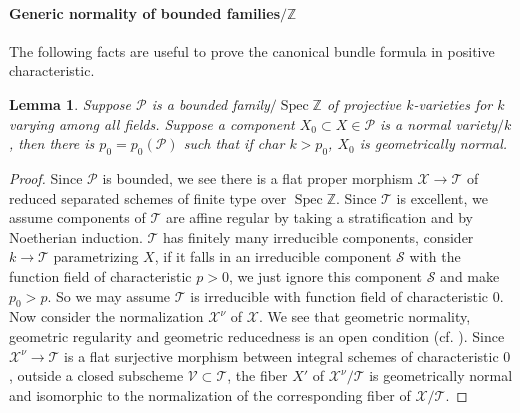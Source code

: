 \documentclass[letterpaper,reqno,12pt]{amsart}
\DeclareMathOperator{\Spec}{Spec}
\newcommand{\tbf}{\textbf}
\numberwithin{equation}{section}
\theoremstyle{plain}
\newtheorem{lemma}[theorem]{Lemma}
\begin{document}
\paragraph{\tbf{Generic normality of bounded families$/\mathbb Z$}}
The following facts are useful to prove the canonical bundle formula in positive characteristic.
\begin{lemma}\label{genorm}
    Suppose $\mathcal P$ is a bounded family$/\Spec\mathbb Z$ of projective $k$-varieties for $k$ varying among all fields. Suppose a component $X_0\subset X\in\mathcal P$ is a normal variety$/k$, then there is $p_0=p_0(\mathcal P)$ such that if char $k>p_0$, $X_0$ is geometrically normal.
\end{lemma}
\begin{proof}
    Since $\mathcal P$ is bounded, we see there is a flat proper morphism $\mathcal X\to\mathcal T$ of reduced separated schemes of finite type over $\Spec\mathbb Z$. Since $\mathcal T$ is excellent, we assume components of $\mathcal T$ are affine regular by taking a stratification and by Noetherian induction. $\mathcal T$ has finitely many irreducible components, consider $k\to \mathcal T$ parametrizing $X$, if it falls in an irreducible component $\mathcal S$ with the function field of characteristic $p>0$, we just ignore this component $\mathcal S$ and make $p_0>p$. So we may assume $\mathcal T$ is irreducible with function field of characteristic $0$. Now consider the normalization $\mathcal X^\nu$ of $\mathcal X$. We see that geometric normality, geometric regularity and geometric reducedness is an open condition (cf. \cite[II.6.9.1 and III.12.1.1]{PMIHES_1967__32__5_0}). Since $\mathcal X^\nu\to \mathcal T$ is a flat surjective morphism between integral schemes of characteristic $0$, outside a closed subscheme $\mathcal V\subset \mathcal T$, the fiber $X'$ of $\mathcal X^\nu/\mathcal T$ is geometrically normal and isomorphic to the normalization of the corresponding fiber of $\mathcal X/\mathcal T$.
        

\end{proof}
\end{document}
